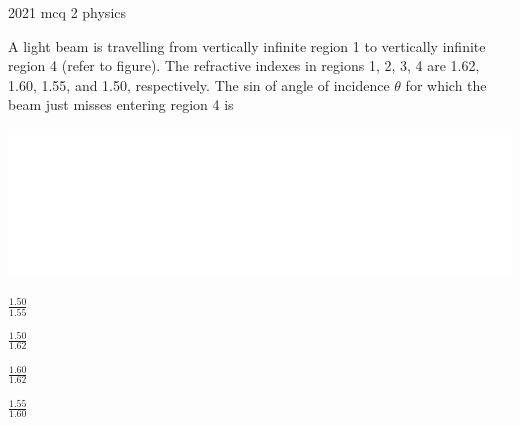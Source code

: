 \ylDisplay
{}%
{2021}%
{mcq}%
{2}%
{physics}%
{}%
{
\ifStatement
A light beam is travelling from vertically infinite region 1 to vertically infinite region 4 (refer to figure). The refractive indexes in regions 1, 2, 3, 4 are \num{1.62}, \num{1.60}, \num{1.55}, and \num{1.50}, respectively. The sin of angle of incidence $\theta$ for which the beam just misses entering region 4 is
\begin{center}
  \includegraphics[width=.7\linewidth]{2021-mcq-02-p}
\end{center}

\fi


$\frac{\num{1.50}}{\num{1.55}}$
\fi


$\frac{\num{1.50}}{\num{1.62}}$
\fi


$\frac{\num{1.60}}{\num{1.62}}$
\fi


$\frac{\num{1.55}}{\num{1.60}}$
\fi


\ifHint

\fi


\ifSolution

\fi


\ifEstStatement

\fi



\fi



\fi



\fi



\fi


\ifEstHint

\fi


\ifEstSolution

\fi
}
